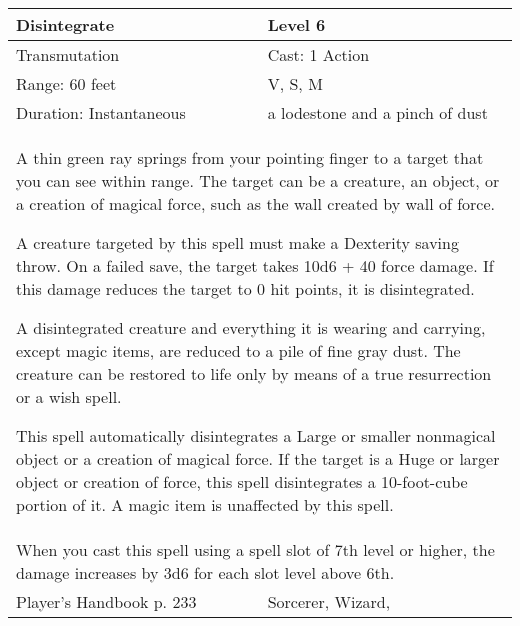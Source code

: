 \documentclass[11pt]{report}
\begin{document}
\begin{table}[H]
	\begin{tabular}{||p{6cm}|p{6cm}||}
		\hline\hline
		\bf{Disintegrate} & Level 6\\ \hline
		Transmutation & Cast: 1 Action\\ \hline
		Range: 60 feet & V, S, M \\ \hline
		Duration: Instantaneous & a lodestone and a pinch of dust\\ \hline
		\multicolumn{2}{||p{12cm}||}{A thin green ray springs from your pointing finger to a target that you can see within range. 
The target can be a creature, an object, or a creation of magical force, such as the wall created by wall of force. 

A creature targeted by this spell must make a Dexterity saving throw. On a failed save, the target takes 10d6 + 40 force damage. If this damage reduces the target to 0 hit points, it is disintegrated. 

A disintegrated creature and everything it is wearing and carrying, except magic items, are reduced to a pile of fine gray dust. The creature can be restored to life only by means of a true resurrection or a wish spell. 

This spell automatically disintegrates a Large or smaller nonmagical object or a creation of magical force. If the target is a Huge or larger object or creation of force, this spell disintegrates a 10-foot-cube portion of it. A magic item is unaffected by this spell.}\\ \hline
		\multicolumn{2}{||p{12cm}||}{When you cast this spell using a spell slot of 7th level or higher, the damage increases by 3d6 for each slot level above 6th.}\\ \hline
Player's Handbook p. 233 & Sorcerer, Wizard, \\ \hline\hline
	\end{tabular}
\end{table}
\end{document}
